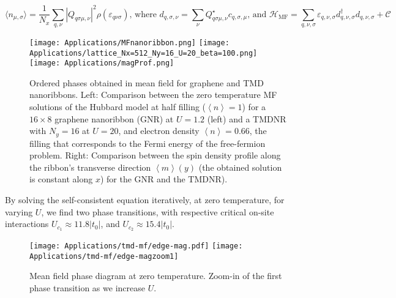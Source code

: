 \begin{equation}
\big\langle n_{\mu, \sigma} \big\rangle = \frac{1}{N_x}\sum_{q, \nu} | Q_{q \sigma \mu, \nu} |^2 \rho ( \varepsilon_{q \nu \sigma} ) , \, \text{where} \,\, d_{q, \sigma, \nu} = \sum_\nu Q_{q \sigma \mu, \nu}^\star c_{q ,\sigma, \mu} ,  \, \text{and} \,\, \mathcal{H}_{\text{MF}} = \sum_{q, \nu, \sigma} \varepsilon_{q, \nu, \sigma} d_{q, \nu, \sigma}^\dagger d_{q, \nu, \sigma} + \mathcal{C}
\end{equation}
\begin{figure}[H]
\hspace{0.1cm}
\texttt{[image: Applications/MFnanoribbon.png]}
\hspace{0.05cm}
\texttt{[image: Applications/lattice\_Nx=512\_Ny=16\_U=20\_beta=100.png]}
\hspace{1cm}
\texttt{[image: Applications/magProf.png]}
	\caption[Comparison between the zero temperature MF solutions of the Hubbard model for a graphene nanoribbon(GNR) and a \acs{TMDNR}. Spin density profile along the ribbon's transverse direction.]{Ordered phases obtained in mean field for graphene and \ac{TMD} nanoribbons. Left: Comparison between the zero temperature MF solutions of the Hubbard model at half filling ($\left\langle n \right\rangle = 1$) for a $16 \times 8$ graphene nanoribbon (GNR) at $U=1.2$ (left) and a  \acs{TMDNR} with $N_y = 16$ at $U = 20$, and electron density $\left\langle n \right\rangle = 0.66$, the filling that corresponds to the Fermi energy of the free-fermion problem.
	Right: Comparison between the spin density profile along the ribbon's transverse direction $\left\langle m \right\rangle (y)$ (the obtained solution is constant along $x$) for the GNR and the \acs{TMDNR}).}
	\label{fig:nanoGraphVsTMD}
\end{figure}
By solving the self-consistent equation iteratively, at zero temperature, for varying $U$, we find two phase transitions, with respective critical on-site interactions $U_{c_1} \approx 11.8 |t_0|$, and $U_{c_2} \approx 15.4 |t_0|$.
\begin{figure}[H]
\texttt{[image: Applications/tmd-mf/edge-mag.pdf]}
\hspace{0.5cm}
\texttt{[image: Applications/tmd-mf/edge-magzoom1]}
	\caption[Mean field phase diagram at zero temperature. Zoom-in of the first phase transition as we increase $U$.]{Mean field phase diagram at zero temperature. Zoom-in of the first phase transition as we increase $U$.}
	\label{fig:zeroTphaseDiagram}
\end{figure}
